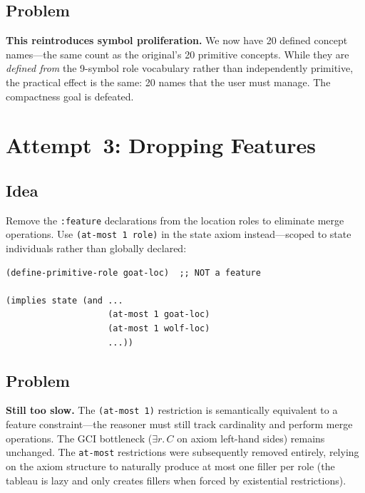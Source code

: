 \documentclass[11pt,a4paper]{article}
\newcommand{\DLsome}[2]{\exists #1.\,#2}
\newcommand{\role}[1]{\ensuremath{\mathit{#1}}}
\begin{document}
\subsection{Problem}

\textbf{This reintroduces symbol proliferation.}  We now have 20 defined
concept names---the same count as the original's 20 primitive concepts.
While they are \emph{defined from} the 9-symbol role vocabulary rather
than independently primitive, the practical effect is the same: 20
names that the user must manage.  The compactness goal is defeated.

\section{Attempt~3: Dropping Features}
\label{sec:attempt3}

\subsection{Idea}

Remove the \texttt{:feature} declarations from the location roles to
eliminate merge operations.  Use \texttt{(at-most 1 role)} in the state
axiom instead---scoped to state individuals rather than globally
declared:

\begin{lstlisting}[style=racer]
(define-primitive-role goat-loc)  ;; NOT a feature

(implies state (and ...
                    (at-most 1 goat-loc)
                    (at-most 1 wolf-loc)
                    ...))
\end{lstlisting}

\subsection{Problem}

\textbf{Still too slow.}  The \texttt{(at-most~1)} restriction is
semantically equivalent to a feature constraint---the reasoner must
still track cardinality and perform merge operations.  The GCI
bottleneck ($\DLsome{\role{r}}{C}$ on axiom left-hand sides) remains
unchanged.  The \texttt{at-most} restrictions were subsequently removed
entirely, relying on the axiom structure to naturally produce at most one
filler per role (the tableau is lazy and only creates fillers when forced
by existential restrictions).
\end{document}
